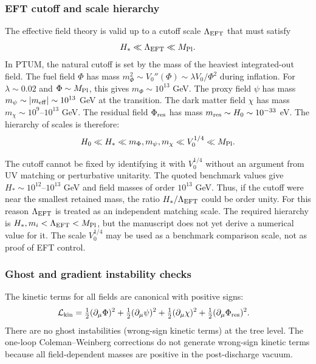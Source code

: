 \documentclass[epj]{svjour}
\begin{document}
\subsubsection{EFT cutoff and scale hierarchy}
\label{sec:eft_cutoff}

The effective field theory is valid up to a cutoff scale
\(\Lambda_{\rm EFT}\) that must satisfy
\begin{equation}
H_* \ll \Lambda_{\rm EFT} \ll M_{\rm Pl}.
\end{equation}
In PTUM, the natural cutoff is set by the mass of the heaviest
integrated-out field. The fuel field \(\Phi\) has mass
\(m_\Phi^2 \sim V_0''(\Phi) \sim \lambda V_0/\Phi^2\) during
inflation. For \(\lambda \sim 0.02\) and \(\Phi \sim M_{\rm Pl}\),
this gives \(m_\Phi \sim 10^{13}\) GeV. The proxy field \(\psi\)
has mass \(m_\psi \sim |m_{\rm eff}| \sim 10^{13}\) GeV at the
transition. The dark matter field \(\chi\) has mass
\(m_\chi \sim 10^{9}\)--\(10^{13}\) GeV. The residual field
\(\Phi_{\rm res}\) has mass \(m_{\rm res} \sim H_0 \sim 10^{-33}\) eV.
The hierarchy of scales is therefore:
\begin{equation}
H_0 \ll H_* \ll m_\Phi, m_\psi, m_\chi \ll V_0^{1/4} \ll M_{\rm Pl}.
\end{equation}

The cutoff cannot be fixed by identifying it with $V_0^{1/4}$ without
an argument from UV matching or perturbative unitarity. The quoted
benchmark values give $H_*\sim10^{12}$--$10^{13}$ GeV and field masses
of order $10^{13}$ GeV. Thus, if the cutoff were near the smallest
retained mass, the ratio $H_*/\Lambda_{\rm EFT}$ could be order unity.
For this reason $\Lambda_{\rm EFT}$ is treated as an independent
matching scale. The required hierarchy is
$H_*,m_i<\Lambda_{\rm EFT}<M_{\rm Pl}$, but the manuscript does not
yet derive a numerical value for it. The scale $V_0^{1/4}$ may be
used as a benchmark comparison scale, not as proof of EFT control.

\subsubsection{Ghost and gradient instability checks}
\label{sec:ghost_gradient}

The kinetic terms for all fields are canonical with positive
signs:
\begin{align}
\mathcal{L}_{\rm kin} &=
\tfrac{1}{2}(\partial_\mu\Phi)^2
+\tfrac{1}{2}(\partial_\mu\psi)^2
+\tfrac{1}{2}(\partial_\mu\chi)^2
+\tfrac{1}{2}(\partial_\mu\Phi_{\rm res})^2.
\end{align}
There are no ghost instabilities (wrong-sign kinetic terms) at the
tree level. The one-loop Coleman--Weinberg corrections do not
generate wrong-sign kinetic terms because all field-dependent
masses are positive in the post-discharge vacuum.
\end{document}
